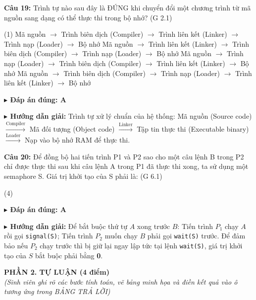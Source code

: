 \documentclass[11pt,a4paper]{article}
\newcommand{\giaithich}[2]{%
    \par\vspace{0.15cm}\noindent
    \begingroup\small
    \noindent\textbf{\color{blue}$\blacktriangleright$ Đáp án đúng: #1} \par\vspace{0.08cm}
    \noindent\textbf{\color{teal}$\blacktriangleright$ Hướng dẫn giải:} #2
    \endgroup\par\vspace{0.35cm}
}
\begin{document}
\noindent\textbf{Câu 19:} Trình tự nào sau đây là ĐÚNG khi chuyển đổi một chương trình từ mã nguồn sang dạng có thể thực thi trong bộ nhớ? (G 2.1)
\begin{tasks}(1)
    \task Mã nguồn $\to$ Trình biên dịch (Compiler) $\to$ Trình liên kết (Linker) $\to$ Trình nạp (Loader) $\to$ Bộ nhớ
    \task Mã nguồn $\to$ Trình liên kết (Linker) $\to$ Trình biên dịch (Compiler) $\to$ Trình nạp (Loader) $\to$ Bộ nhớ
    \task Mã nguồn $\to$ Trình nạp (Loader) $\to$ Trình biên dịch (Compiler) $\to$ Trình liên kết (Linker) $\to$ Bộ nhớ
    \task Mã nguồn $\to$ Trình biên dịch (Compiler) $\to$ Trình nạp (Loader) $\to$ Trình liên kết (Linker) $\to$ Bộ nhớ
\end{tasks}
\giaithich{A}{Trình tự xử lý chuẩn của hệ thống:
Mã nguồn (Source code) $\xrightarrow{\text{Compiler}}$ Mã đối tượng (Object code) $\xrightarrow{\text{Linker}}$ Tập tin thực thi (Executable binary) $\xrightarrow{\text{Loader}}$ Nạp vào bộ nhớ RAM để thực thi.}

\noindent\textbf{Câu 20:} Để đồng bộ hai tiến trình P1 và P2 sao cho một câu lệnh B trong P2 chỉ được thực thi sau khi câu lệnh A trong P1 đã thực thi xong, ta sử dụng một semaphore S. Giá trị khởi tạo của S phải là: (G 6.1)
\begin{tasks}(4)
\end{tasks}
\giaithich{A}{Để bắt buộc thứ tự $A$ xong trước $B$: Tiến trình $P_1$ chạy $A$ rồi gọi \texttt{signal(S)}; Tiến trình $P_2$ muốn chạy $B$ phải gọi \texttt{wait(S)} trước. Để đảm bảo nếu $P_2$ chạy trước thì bị giữ lại ngay lập tức tại lệnh \texttt{wait(S)}, giá trị khởi tạo của $S$ bắt buộc phải bằng \textbf{0}.}

\vspace{0.4cm}

\noindent\textbf{\large PHẦN 2. TỰ LUẬN (4 điểm)}\\
\textit{(Sinh viên ghi rõ các bước tính toán, vẽ bảng minh họa và điền kết quả vào ô tương ứng trong BẢNG TRẢ LỜI)}
\end{document}
